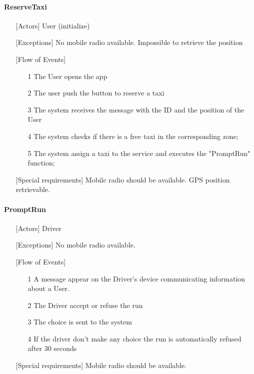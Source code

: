 \documentclass[12pt,a4paper]{book}
\begin{document}
			\paragraph{ReserveTaxi}
			\begin{itemize}
				\item[\textbullet] [Actors] User (initialize)
				\item[\textbullet] [Exceptions] No mobile radio available. Impossible to retrieve the position
				\item[\textbullet] [Flow of Events]
				\begin{itemize}
					\item[1] The User opens the app
					\item[2] The user push the button to reserve a taxi
					\item[3] The system receives the message with the ID and the position of the User
					\item[4] The system checks if there is a free taxi in the corresponding zone;
					\item[5] The system assign a taxi to the service and executes the "PromptRun" function;
				\end{itemize}
				\item[\textbullet] [Special requirements] Mobile radio should be available. GPS position retrievable.
			\end{itemize}
			\paragraph{PromptRun}
			\begin{itemize}
				\item[\textbullet] [Actors] Driver
				\item[\textbullet] [Exceptions] No mobile radio available.
				\item[\textbullet] [Flow of Events]
				\begin{itemize}
					\item[1] A message appear on the Driver's device communicating information about a User.
					\item[2] The Driver accept or refuse the run
					\item[3] The choice is sent to the system
					\item[4] If the driver don't make any choice the run is automatically refused after 30 seconds
				\end{itemize}
				\item[\textbullet] [Special requirements] Mobile radio should be available.
			\end{itemize}
\end{document}
